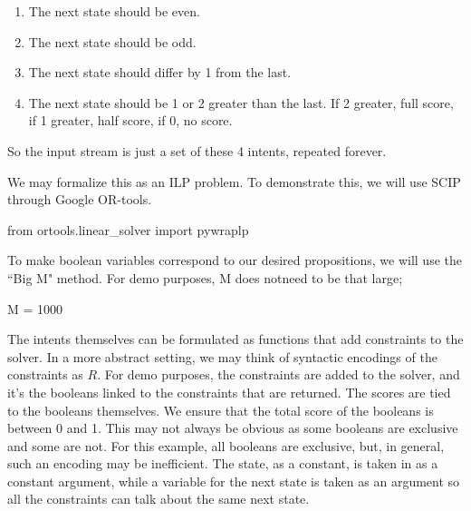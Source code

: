 \begin{enumerate}
    \item The next state should be even.
    \item The next state should be odd.
    \item The next state should differ by 1 from the last.
    \item The next state should be 1 or 2 greater than the last. If 2 greater, full score, if 1 greater, half score, if 0, no score.
\end{enumerate}

So the input stream is just a set of these 4 intents, repeated forever.

We may formalize this as an ILP problem. To demonstrate this, we will use SCIP through Google OR-tools.

\begin{betterpython}
    from ortools.linear_solver import pywraplp
\end{betterpython}

To make boolean variables correspond to our desired propositions, we will use the ``Big M" method. For demo purposes, M does notneed to be that large;

\begin{betterpython}
    M = 1000
\end{betterpython}

The intents themselves can be formulated as functions that add constraints to the solver. In a more abstract setting, we may think of syntactic encodings of the constraints as $R$. For demo purposes, the constraints are added to the solver, and it's the booleans linked to the constraints that are returned. The scores are tied to the booleans themselves. We ensure that the total score of the booleans is between 0 and 1. This may not always be obvious as some booleans are exclusive and some are not. For this example, all booleans are exclusive, but, in general, such an encoding may be inefficient. The state, as a constant, is taken in as a constant argument, while a variable for the next state is taken as an argument so all the constraints can talk about the same next state.

